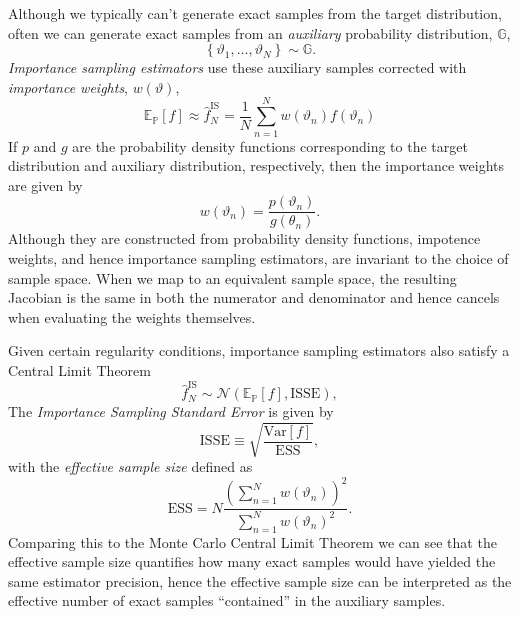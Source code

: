 \documentclass[11pt, oneside]{article}
\newcommand{\PP}{ \mathbb{P} }
\newcommand{\EE}{ \mathbb{E} }
\begin{document}
Although we typically can't generate exact samples from the target 
distribution, often we can generate exact samples from an 
\emph{auxiliary} probability distribution, $\mathbb{G}$,
%
\begin{equation*}
\left\{ \vartheta_{1}, \ldots, \vartheta_{N} \right\} \sim \mathbb{G}.
\end{equation*}
%
\emph{Importance sampling estimators} use these auxiliary samples 
corrected with \emph{importance weights}, $w \! \left( \vartheta \right)$,  
%
\begin{equation*}
\EE_{\PP} [ f ] \approx 
\hat{f}^{\mathrm{IS}}_{N} = 
\frac{1}{N} \sum_{n = 1}^{N} 
w \! \left( \vartheta_{n} \right) f \! \left( \vartheta_{n} \right)
\end{equation*}
%
If $p$ and $g$ are the probability density functions corresponding to
the target distribution and auxiliary distribution, respectively, then the 
importance weights are given by
%
\begin{equation*}
w \! \left( \vartheta_{n} \right) =
\frac{ p \! \left( \vartheta_{n} \right) }
{ g \! \left( \theta_{n} \right) }.
\end{equation*}
%
Although they are constructed from probability density functions, 
impotence weights, and hence importance sampling estimators,
are invariant to the choice of sample space.  When we map to
an equivalent sample space, the resulting Jacobian is the same
in both the numerator and denominator and hence cancels when
evaluating the weights themselves.

Given certain regularity conditions, importance sampling estimators 
also satisfy a Central Limit Theorem
%
\begin{equation*}
\hat{f}_{N}^{\mathrm{IS}} \sim 
\mathcal{N} \! \left( \EE_{\PP} [ f ],
\mathrm{ISSE} \right),
\end{equation*}
%
The \emph{Importance Sampling Standard Error} is given by
%
\begin{equation*}
\mathrm{ISSE} \equiv \sqrt{ \frac{ \mathrm{Var} [ f ] }{\mathrm{ESS} } },
\end{equation*}
%
with the \emph{effective sample size} defined as
%
\begin{equation*}
\mathrm{ESS} = 
N 
\frac{ \left( \sum_{n = 1}^{N} w \! \left( \vartheta_{n} \right) \right)^{2} }
{ \sum_{n = 1}^{N} w \! \left( \vartheta_{n} \right)^{2} }.
\end{equation*}
%
Comparing this to the Monte Carlo Central Limit Theorem we can
see that the effective sample size quantifies how many exact
samples would have yielded the same estimator precision,
hence the effective sample size can be interpreted as the
effective number of exact samples ``contained'' in the auxiliary
samples.
\end{document}
